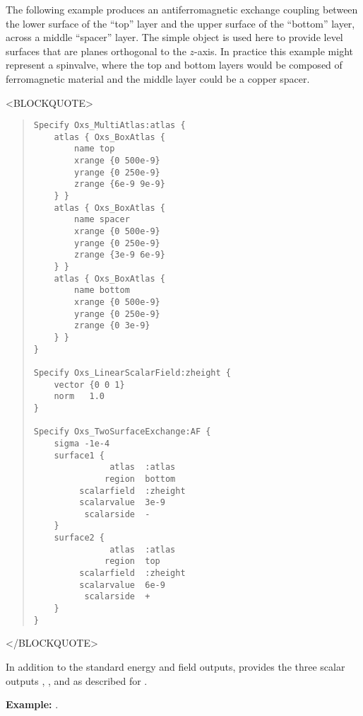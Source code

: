 \begin{itemize}
\begin{description}
   The following example produces an antiferromagnetic exchange coupling
   between the lower surface of the ``top'' layer and the upper surface
   of the ``bottom'' layer, across a middle ``spacer'' layer.  The
   simple  object is used here to provide
   level surfaces that are planes orthogonal to the $z$-axis.  In
   practice this example might represent a spinvalve, where the top and
   bottom layers would be composed of ferromagnetic material and the
   middle layer could be a copper spacer.
\begin{rawhtml}<BLOCKQUOTE>\end{rawhtml}
\begin{quote}
\begin{verbatim}
Specify Oxs_MultiAtlas:atlas {
    atlas { Oxs_BoxAtlas {
        name top
        xrange {0 500e-9}
        yrange {0 250e-9}
        zrange {6e-9 9e-9}
    } }
    atlas { Oxs_BoxAtlas {
        name spacer
        xrange {0 500e-9}
        yrange {0 250e-9}
        zrange {3e-9 6e-9}
    } }
    atlas { Oxs_BoxAtlas {
        name bottom
        xrange {0 500e-9}
        yrange {0 250e-9}
        zrange {0 3e-9}
    } }
}

Specify Oxs_LinearScalarField:zheight {
    vector {0 0 1}
    norm   1.0
}

Specify Oxs_TwoSurfaceExchange:AF {
    sigma -1e-4
    surface1 {
               atlas  :atlas
              region  bottom
         scalarfield  :zheight
         scalarvalue  3e-9
          scalarside  -
    }
    surface2 {
               atlas  :atlas
              region  top
         scalarfield  :zheight
         scalarvalue  6e-9
          scalarside  +
    }
}
\end{verbatim}
\end{quote}
\begin{rawhtml}</BLOCKQUOTE>\end{rawhtml}

   In addition to the standard energy and field outputs,
    provides the three scalar outputs
   , , and
    as described for .

\textbf{Example:} .



\end{description}
\end{itemize}
